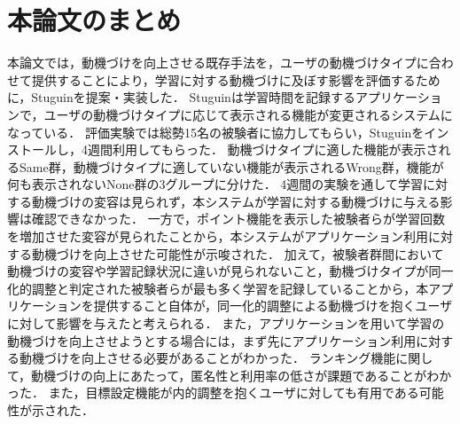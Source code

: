 \section{本論文のまとめ}
本論文では，動機づけを向上させる既存手法を，ユーザの動機づけタイプに合わせて提供することにより，学習に対する動機づけに及ぼす影響を評価するために，Stuguinを提案・実装した．
Stuguinは学習時間を記録するアプリケーションで，ユーザの動機づけタイプに応じて表示される機能が変更されるシステムになっている．
評価実験では総勢15名の被験者に協力してもらい，Stuguinをインストールし，4週間利用してもらった．
動機づけタイプに適した機能が表示されるSame群，動機づけタイプに適していない機能が表示されるWrong群，機能が何も表示されないNone群の3グループに分けた．
4週間の実験を通して学習に対する動機づけの変容は見られず，本システムが学習に対する動機づけに与える影響は確認できなかった．
一方で，ポイント機能を表示した被験者らが学習回数を増加させた変容が見られたことから，本システムがアプリケーション利用に対する動機づけを向上させた可能性が示唆された．
加えて，被験者群間において動機づけの変容や学習記録状況に違いが見られないこと，動機づけタイプが同一化的調整と判定された被験者らが最も多く学習を記録していることから，本アプリケーションを提供すること自体が，同一化的調整による動機づけを抱くユーザに対して影響を与えたと考えられる．
また，アプリケーションを用いて学習の動機づけを向上させようとする場合には，まず先にアプリケーション利用に対する動機づけを向上させる必要があることがわかった．
ランキング機能に関して，動機づけの向上にあたって，匿名性と利用率の低さが課題であることがわかった．
また，目標設定機能が内的調整を抱くユーザに対しても有用である可能性が示された．